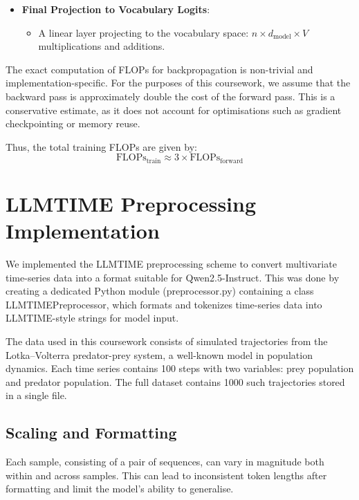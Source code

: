 \documentclass[a4paper,12pt]{article}
\begin{document}
\begin{itemize}
  \item \textbf{Final Projection to Vocabulary Logits}:
  \begin{itemize}
    \item A linear layer projecting to the vocabulary space: $n \times d_{\text{model}} \times V$ multiplications and additions.
  \end{itemize}
\end{itemize}

The exact computation of FLOPs for backpropagation is non-trivial and implementation-specific. For the purposes of this coursework, we assume that the backward pass is approximately double the cost of the forward pass. This is a conservative estimate, as it does not account for optimisations such as gradient checkpointing or memory reuse.

Thus, the total training FLOPs are given by:
\begin{equation}
\text{FLOPs}_{\text{train}} \approx 3 \times \text{FLOPs}_{\text{forward}}
\end{equation}

\section{LLMTIME Preprocessing Implementation}


We implemented the LLMTIME preprocessing scheme \citep{gruver2023language} to convert multivariate time-series data into a format suitable for Qwen2.5-Instruct. This was done by creating a dedicated Python module (preprocessor.py) containing a class LLMTIMEPreprocessor, which formats and tokenizes time-series data into LLMTIME-style strings for model input.

The data used in this coursework consists of simulated trajectories from the Lotka–Volterra predator-prey system, a well-known model in population dynamics. Each time series contains 100 steps with two variables: prey population and predator population. The full dataset contains 1000 such trajectories stored in a single file.

\subsection*{Scaling and Formatting}

Each sample, consisting of a pair of sequences, can vary in magnitude both within and across samples. This can lead to inconsistent token lengths after formatting and limit the model’s ability to generalise.
\end{document}
